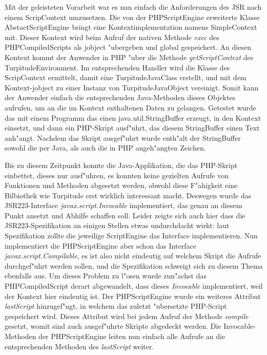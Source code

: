 Mit der geleisteten Vorarbeit war es nun einfach die Anforderungen des JSR nach einem ScripContext umzusetzen. Die von der PHPScriptEngine erweiterte Klasse
AbstactScriptEngine bringt eine Kontextimplementation namens SimpleContext mit. Dieser Kontext wird beim Aufruf der nativen Methode \emph{exec} des PHPCompiledScripts
als jobject "ubergeben und global gespeichert. An diesen Kontext kommt der Anwender in PHP "uber die Methode \emph{getScriptContext} des TurpitudeEnvironment. Im 
entsprechenden Handler wird die Klasse des ScripContext ermittelt, damit eine TurpitudeJavaClass erstellt, und mit dem Kontext-jobject zu einer Instanz von
TurpitudeJavaObject vereinigt. Somit kann der Anwender einfach die entsprechenden Java-Methoden dieses Objektes aufrufen, um an die im Kontext enthaltenen Daten zu
gelangen. Getestet wurde das mit einem Programm das einen java.util.StringBuffer erzeugt, in den Kontext einsetzt, und dann ein PHP-Skript ausf"uhrt, das diesem
StringBuffer einen Text anh"angt. Nachdem das Skript ausgef"uhrt wurde enth"alt der StringBuffer sowohl die per Java, als auch die in PHP angeh"angten Zeichen.

Bis zu diesem Zeitpunkt konnte die Java-Applikation, die das PHP-Skript einbettet, dieses nur ausf"uhren, es konnten keine gezielten Aufrufe von Funktionen und Methoden
abgesetzt werden, obwohl diese F"ahigkeit eine Bilbiothek wie Turpitude erst wirklich interessant macht. Deswegen wurde das JSR223-Interface \emph{javax.script.Invocable}
implementiert, das genau an diesem Punkt ansetzt und Abhilfe schaffen soll. Leider zeigte sich auch hier dass die JSR223-Spezifikation an einigen Stellen
etwas undurchdacht wirkt: laut Spezifikation zollte die jeweilige ScriptEngine das Interface implementieren. Nun implementiert die PHPScriptEngine aber schon
das Interface \emph{javax.script.Compilable}, es ist also nicht eindeutig auf welchem Skript die Aufrufe durchgef"uhrt werden sollen, und die Spezifikation schweigt
sich zu diesem Thema ebenfalls aus. Um dieses Problem zu l"osen wurde zun"achst das PHPCompiledScript derart abgewandelt, dass dieses \emph{Invocable} implementiert,
weil der Kontext hier eindeutig ist. Der PHPScriptEngine wurde ein weiteres Attribut \emph{lastScript} hinzugef"ugt, in welchem das zuletzt "ubersetzte 
PHP-Script gespeichert wird. Dieses Attribut wird bei jedem Aufruf der Methode \emph{compile} gesetzt, womit sind auch ausgef"uhrte Skripte abgedeckt werden.
Die Invocable-Methoden der PHPScriptEngine leiten nun einfach alle Aufrufe an die entsprechenden Methoden des \emph{lastScript} weiter.

